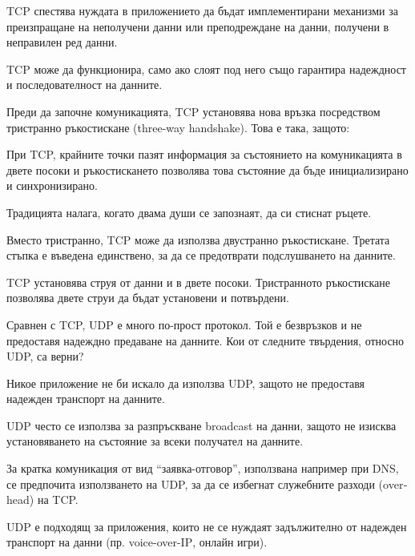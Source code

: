 \begin{questions}
\begin{choices}
    \CorrectChoice TCP спестява нуждата в приложението да бъдат имплементирани
    механизми за преизпращане на неполучени данни или преподреждане на данни,
    получени в неправилен ред данни.

    \choice TCP може да функционира, само ако слоят под него също гарантира
    надеждност и последователност на данните.
  \end{choices}

  \question[6] Преди да започне комуникацията, TCP установява нова връзка
  посредством тристранно ръкостискане (\foreignlanguage{english}{three-way
    handshake}). Това е така, защото:
  \begin{choices}

    \CorrectChoice При TCP, крайните точки пазят информация за състоянието на
    комуникацията в двете посоки и ръкостискането позволява това състояние да
    бъде инициализирано и синхронизирано.

    \choice Традицията налага, когато двама души се запознаят, да си стиснат
    ръцете.

    \choice Вместо тристранно, TCP може да използва двустранно
    ръкостискане. Третата стъпка е въведена единствено, за да се предотврати
    подслушването на данните.

    \CorrectChoice TCP установява струя от данни и в двете посоки. Тристранното
    ръкостискане позволява двете струи да бъдат установени и потвърдени.
  \end{choices}

  \question[6] Сравнен с TCP, UDP е много по-прост протокол. Той е безвръзков и
  не предоставя надеждно предаване на данните. Кои от следните твърдения,
  относно UDP, са верни?
  \begin{choices}
    \choice Никое приложение не би искало да използва UDP, защото не предоставя
    надежден транспорт на данните.

    \CorrectChoice UDP често се използва за разпръскване
    \foreignlanguage{english}{broadcast} на данни, защото не изисква
    установяването на състояние за всеки получател на данните.

    \CorrectChoice За кратка комуникация от вид "`заявка-отговор"', използвана
    например при DNS, се предпочита използването на UDP, за да се избегнат
    служебните разходи (\foreignlanguage{english}{overhead}) на TCP.

    \CorrectChoice UDP е подходящ за приложения, които не се нуждаят
    задължително от надежден транспорт на данни
    (пр. \foreignlanguage{english}{voice-over-IP}, онлайн игри).
  \end{choices}


\end{questions}
